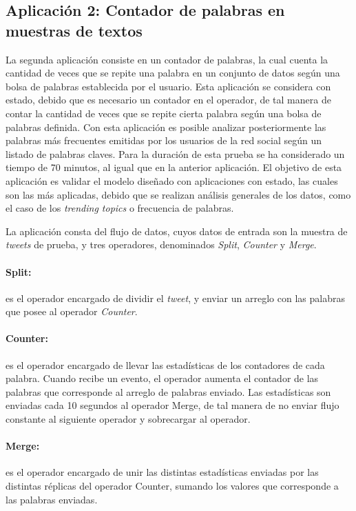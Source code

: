\subsection{Aplicaci\'on 2: Contador de palabras en muestras de textos}
La segunda aplicaci\'on consiste en un contador de palabras, la cual cuenta la cantidad de veces que se repite una palabra en un conjunto de datos seg\'un una bolsa de palabras establecida por el usuario. Esta aplicaci\'on se considera con estado, debido que es necesario un contador en el operador, de tal manera de contar la cantidad de veces que se repite cierta palabra seg\'un una bolsa de palabras definida. Con esta aplicaci\'on es posible analizar posteriormente las palabras m\'as frecuentes emitidas por los usuarios de la red social seg\'un un listado de palabras claves. Para la duraci\'on de esta prueba se ha considerado un tiempo de 70 minutos, al igual que en la anterior aplicaci\'on. El objetivo de esta aplicaci\'on es validar el modelo dise\~nado con aplicaciones con estado, las cuales son las m\'as aplicadas, debido que se realizan an\'alisis generales de los datos, como el caso de los \textit{trending topics} o frecuencia de palabras.

La aplicaci\'on consta del flujo de datos, cuyos datos de entrada son la muestra de \textit{tweets} de prueba, y tres operadores, denominados \textit{Split}, \textit{Counter} y \textit{Merge}.

\paragraph{Split:} es el operador encargado de dividir el \textit{tweet}, y enviar un arreglo con las palabras que posee al operador \textit{Counter}.

\paragraph{Counter:} es el operador encargado de llevar las estad\'isticas de los contadores de cada palabra. Cuando recibe un evento, el operador aumenta el contador de las palabras que corresponde al arreglo de palabras enviado. Las estad\'isticas son enviadas cada 10 segundos al operador Merge, de tal manera de no enviar flujo constante al siguiente operador y sobrecargar al operador.

\paragraph{Merge:} es el operador encargado de unir las distintas estad\'isticas enviadas por las distintas r\'eplicas del operador Counter, sumando los valores que corresponde a las palabras enviadas.

